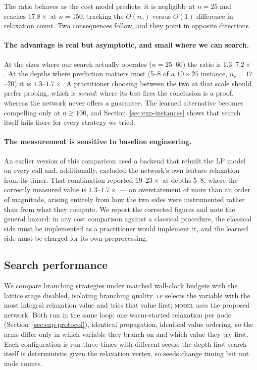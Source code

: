 \documentclass[preprint,12pt]{elsarticle}
\begin{document}
The ratio behaves as the cost model predicts: it is negligible at $n=25$ and reaches $17.8\times$ at $n=150$, tracking the $O(n_c)$ versus $O(1)$ difference in relaxation count. Two consequences follow, and they point in opposite directions.

\paragraph{The advantage is real but asymptotic, and small where we can search.} At the sizes where our search actually operates ($n=25$--$60$) the ratio is $1.3$--$7.2\times$. At the depths where prediction matters most (5--8 of a $10\times25$ instance, $n_c=17$--$20$) it is $1.3$--$1.7\times$. A practitioner choosing between the two at that scale should prefer probing, which is \emph{sound}: where its test fires the conclusion is a proof, whereas the network never offers a guarantee. The learned alternative becomes compelling only at $n\gtrsim 100$, and Section~\ref{sec:exp-instances} shows that search itself fails there for every strategy we tried.

\paragraph{The measurement is sensitive to baseline engineering.} An earlier version of this comparison used a backend that rebuilt the LP model on every call and, additionally, excluded the network's own feature relaxation from its timer. That combination reported $19$--$23\times$ at depths 5--8, where the correctly measured value is $1.3$--$1.7\times$ --- an overstatement of more than an order of magnitude, arising entirely from how the two sides were instrumented rather than from what they compute. We report the corrected figures and note the general hazard: in any cost comparison against a classical procedure, the classical side must be implemented as a practitioner would implement it, and the learned side must be charged for its own preprocessing.

\subsection{Search performance}
\label{sec:exp-search}

We compare branching strategies under matched wall-clock budgets with the lattice stage disabled, isolating branching quality. \textsc{lp} selects the variable with the most integral relaxation value and tries that value first; \textsc{model} uses the proposed network. Both run in the same loop: one warm-started relaxation per node (Section~\ref{sec:exp-protocol}), identical propagation, identical value ordering, so the arms differ only in which variable they branch on and which value they try first. Each configuration is run three times with different seeds; the depth-first search itself is deterministic given the relaxation vertex, so seeds change timing but not node counts.
\end{document}
